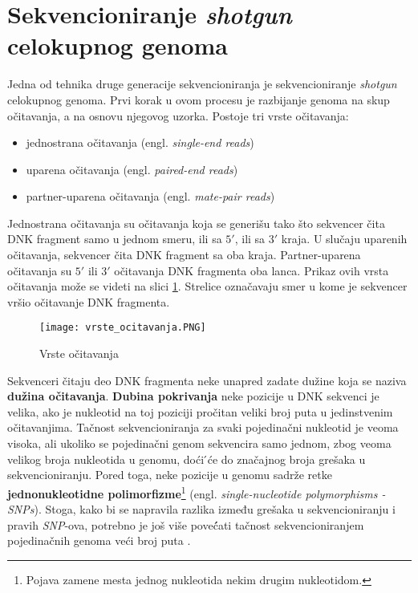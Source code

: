 \documentclass[12pt,oneside]{memoir}
\begin{document}
\section{Sekvencioniranje \textit{shotgun} celokupnog genoma}

Jedna od tehnika druge generacije sekvencioniranja je  sekvencioniranje \textit{shotgun} celokupnog genoma. Prvi korak u ovom procesu je razbijanje genoma na skup očitavanja, a na osnovu njegovog uzorka. Postoje tri vrste očitavanja:

\begin{itemize}
\itemsep0em 
    \item {jednostrana očitavanja (engl. \textit{single-end reads})}
    \item {uparena očitavanja (engl. \textit{paired-end reads})}
    \item{partner-uparena očitavanja} (engl. \textit{mate-pair reads})
\end{itemize}

Jednostrana očitavanja su očitavanja koja se generišu tako što sekvencer čita DNK fragment samo u jednom smeru, ili sa $5'$, ili sa $3'$ kraja. U slučaju uparenih očitavanja, sekvencer čita DNK fragment sa oba kraja. Partner-uparena očitavanja su $5'$ ili $3'$ očitavanja DNK fragmenta oba lanca. Prikaz ovih vrsta očitavanja može se videti na slici \ref{fig:01}. Strelice označavaju smer u kome je sekvencer vršio očitavanje DNK fragmenta.

\begin{figure}[!ht]
  \centering
  \texttt{[image: vrste\_ocitavanja.PNG]}
  \caption{Vrste očitavanja \cite{wholeGenomeSeq}}
  \label{fig:01}
\end{figure}

Sekvenceri čitaju deo DNK fragmenta neke unapred
zadate dužine koja se naziva \textbf{dužina očitavanja}. \textbf{Dubina pokrivanja} neke pozicije u DNK sekvenci je velika, ako je nukleotid na toj poziciji pročitan veliki broj puta u jedinstvenim očitavanjima. Tačnost sekvencioniranja za svaki pojedinačni nukleotid je veoma visoka, ali ukoliko se pojedinačni genom sekvencira samo jednom, zbog veoma velikog broja nukleotida u genomu, doći ́će do značajnog broja grešaka u sekvencioniranju. Pored toga, neke pozicije u genomu sadrže retke \textbf{jednonukleotidne polimorfizme}\footnote{Pojava zamene mesta jednog nukleotida nekim drugim nukleotidom.} (engl. \textit{single-nucleotide polymorphisms - SNPs}). Stoga, kako bi se napravila razlika između grešaka u sekvencioniranju i pravih \textit{SNP}-ova, potrebno je još više poveć́ati tačnost sekvencioniranjem pojedinačnih genoma veći broj puta \cite{SequencingCoverage}.
\end{document}
